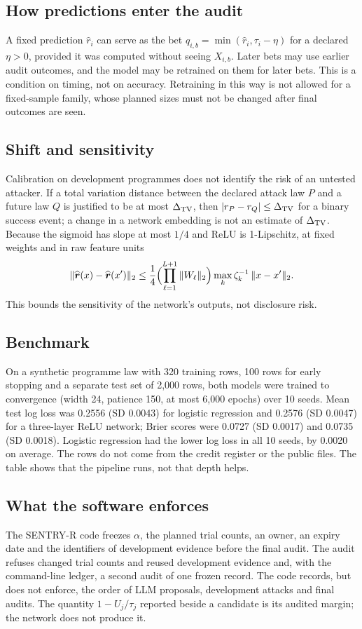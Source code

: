 \subsection{How predictions enter the audit}
A fixed prediction $\widehat r_i$ can serve as the bet $q_{i,b}=\min(\widehat r_i,\tau_i-\eta)$ for a declared $\eta>0$, provided it was computed without seeing $X_{i,b}$. Later bets may use earlier audit outcomes, and the model may be retrained on them for later bets. This is a condition on timing, not on accuracy. Retraining in this way is not allowed for a fixed-sample family, whose planned sizes must not be changed after final outcomes are seen.

\subsection{Shift and sensitivity}
Calibration on development programmes does not identify the risk of an untested attacker. If a total variation distance between the declared attack law $P$ and a future law $Q$ is justified to be at most $\Delta_{\rm TV}$, then $|r_P-r_Q|\le\Delta_{\rm TV}$ for a binary success event; a change in a network embedding is not an estimate of $\Delta_{\rm TV}$. Because the sigmoid has slope at most $1/4$ and ReLU is 1-Lipschitz, at fixed weights and in raw feature units
\begin{equation}\label{eq:lipschitz}
\|\widehat{\boldsymbol r}(x)-\widehat{\boldsymbol r}(x')\|_2\le\frac14\Bigl(\prod_{\ell=1}^{L+1}\|W_\ell\|_2\Bigr)\max_k\zeta_k^{-1}\,\|x-x'\|_2 .
\end{equation}
This bounds the sensitivity of the network's outputs, not disclosure risk.

\subsection{Benchmark}
On a synthetic programme law with 320 training rows, 100 rows for early stopping and a separate test set of 2,000 rows, both models were trained to convergence (width 24, patience 150, at most 6,000 epochs) over 10 seeds. Mean test log loss was 0.2556 (SD 0.0043) for logistic regression and 0.2576 (SD 0.0047) for a three-layer ReLU network; Brier scores \cite{brier1950} were 0.0727 (SD 0.0017) and 0.0735 (SD 0.0018). Logistic regression had the lower log loss in all 10 seeds, by 0.0020 on average. The rows do not come from the credit register or the public files. The table shows that the pipeline runs, not that depth helps.

\subsection{What the software enforces}
The SENTRY-R code freezes $\alpha$, the planned trial counts, an owner, an expiry date and the identifiers of development evidence before the final audit. The audit refuses changed trial counts and reused development evidence and, with the command-line ledger, a second audit of one frozen record. The code records, but does not enforce, the order of LLM proposals, development attacks and final audits. The quantity $1-U_j/\tau_j$ reported beside a candidate is its audited margin; the network does not produce it.

